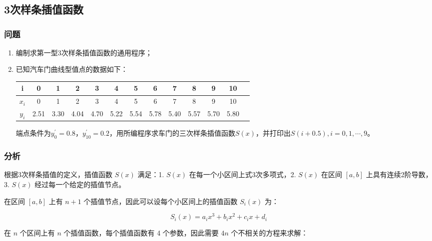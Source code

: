 \chapter[第三章]{} %
\label{cha:chapter3}

\section{3次样条插值函数}

\subsection{问题}

\begin{enumerate}[(1)]
    \item 编制求第一型3次样条插值函数的通用程序；
    \item 已知汽车门曲线型值点的数据如下：

        \begin{table}[ht]\centering
        \begin{tabular}{c|cccccccccccc}
            i & 0 & 1 & 2 & 3 & 4 & 5 & 6 & 7 & 8 & 9 & 10\\
            \hline
            $x_i$ & 0 & 1 & 2 & 3 & 4 & 5 & 6 & 7 & 8 & 9 & 10\\
            $y_i$ & 2.51 & 3.30 & 4.04 & 4.70 & 5.22 & 5.54 & 5.78 & 5.40 & 5.57 & 5.70 & 5.80 
        \end{tabular}
        \end{table}
    
    端点条件为$y_0^{'}=0.8$，$y_{10}^{'}=0.2$，用所编程序求车门的三次样条插值函数$S(x)$，并打印出$S(i+0.5),i=0,1,\cdots,9$。     
\end{enumerate}

\subsection{分析}

根据3次样条插值的定义，插值函数 $S(x)$ 满足：1. $S(x)$ 在每一个小区间上式3次多项式，2. $S(x)$ 在区间 $[a,b]$ 上具有连续2阶导数，3. $S(x)$ 经过每一个给定的插值节点。

在区间 $[a,b]$ 上有 $n+1$ 个插值节点，因此可以设每个小区间上的插值函数 $S_i(x)$ 为：

\begin{equation}
    S_i(x) = a_ix^3  + b_ix^2 + c_ix + d_i
\end{equation}

在 $n$ 个区间上有 $n$ 个插值函数，每个插值函数有 4 个参数，因此需要 $4n$ 个不相关的方程来求解：

